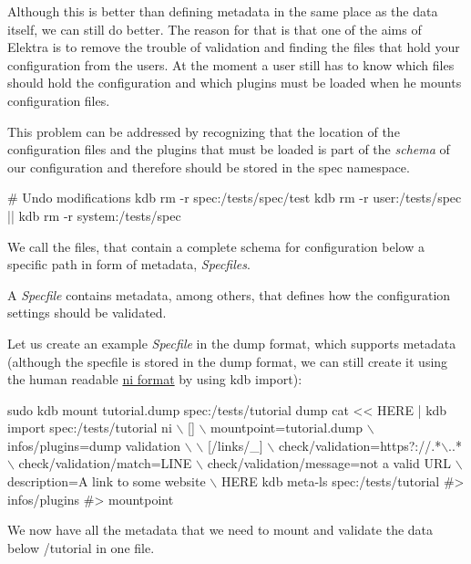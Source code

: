Although this is better than defining metadata in the same place as the data itself, we can still do better. The reason for that is that one of the aims of Elektra is to remove the trouble of validation and finding the files that hold your configuration from the users. At the moment a user still has to know which files should hold the configuration and which plugins must be loaded when he mounts configuration files.

This problem can be addressed by recognizing that the location of the configuration files and the plugins that must be loaded is part of the {\itshape schema} of our configuration and therefore should be stored in the spec namespace.


\begin{DoxyCode}
# Undo modifications
kdb rm -r spec:/tests/spec/test
kdb rm -r user:/tests/spec || kdb rm -r system:/tests/spec
\end{DoxyCode}


We call the files, that contain a complete schema for configuration below a specific path in form of metadata, {\itshape Specfiles}.

A {\itshape Specfile} contains metadata, among others, that defines how the configuration settings should be validated.

Let us create an example {\itshape Specfile} in the dump format, which supports metadata (although the specfile is stored in the dump format, we can still create it using the human readable \hyperlink{autotoc_md469_src_plugins_ni_README_md}{ni format} by using {\ttfamily kdb import})\+:


\begin{DoxyCode}
sudo kdb mount tutorial.dump spec:/tests/tutorial dump
cat << HERE | kdb import spec:/tests/tutorial ni  \(\backslash\)
[]                                         \(\backslash\)
 mountpoint=tutorial.dump                \(\backslash\)
 infos/plugins=dump validation           \(\backslash\)
                                           \(\backslash\)
[/links/\_]                                 \(\backslash\)
check/validation=https?://.*\(\backslash\)..*         \(\backslash\)
check/validation/match=LINE              \(\backslash\)
check/validation/message=not a valid URL \(\backslash\)
description=A link to some website       \(\backslash\)
HERE
kdb meta-ls spec:/tests/tutorial
#> infos/plugins
#> mountpoint
\end{DoxyCode}


We now have all the metadata that we need to mount and validate the data below {\ttfamily /tutorial} in one file.

